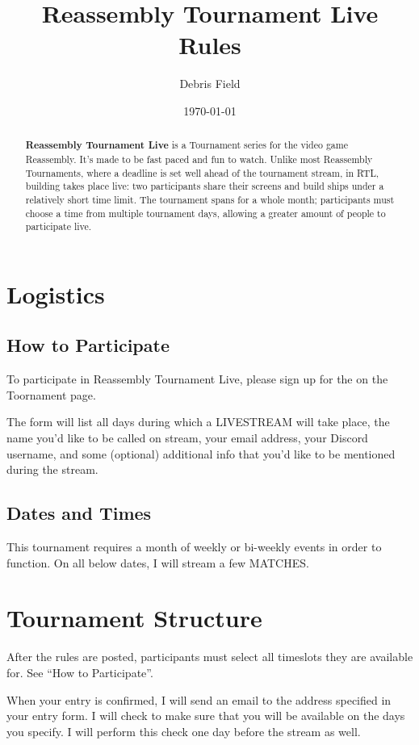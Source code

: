 \documentclass[11pt]{article}
\newcommand{\RTL}{Reassembly Tournament Live}
\newcommand{\termemph}[1]{\uppercase{#1}}
\begin{document}
\title{Reassembly Tournament Live Rules}
\author{Debris Field}
\date{\today}
\maketitle

\begin{abstract}
\textbf{\RTL{}} is a Tournament
series for the video game Reassembly. It's made to be fast paced and fun to watch. Unlike most Reassembly Tournaments, where
a deadline is set well ahead of the tournament stream, in RTL,
building takes place live: two participants share their screens and
build ships under a relatively short time limit. The tournament spans
for a whole month; participants must choose a time from multiple
tournament days, allowing a greater amount of people to participate live.

\end{abstract}

\tableofcontents

\section{Logistics}
\subsection{How to Participate}
To participate in \RTL{}, please sign up for the on the Toornament page.

The form will list all days during which a \termemph{Livestream} will take place, the name you'd like to
be called on stream, your email address, your Discord username, and 
some (optional) additional info that you'd like to be mentioned during the stream.

\subsection{Dates and Times}
This tournament requires a month of weekly or bi-weekly events in order to function. On all
below dates, I will stream a few \termemph{matches}.  

\section{Tournament Structure}
After the rules are posted, participants must select all timeslots they are available for.
See ``How to Participate''.

When your entry is confirmed, I will send an email to the address specified in your entry form.
I will check to make sure that you will be available on the days you specify.
I will perform this check one day before the stream as well.
\end{document}
